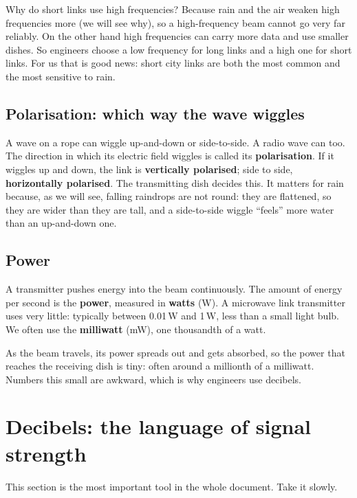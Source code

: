 \documentclass[11pt,a4paper]{article}
\begin{document}
Why do short links use high frequencies? Because rain and the air weaken high frequencies more (we
will see why), so a high-frequency beam cannot go very far reliably. On the other hand high
frequencies can carry more data and use smaller dishes. So engineers choose a low frequency for long
links and a high one for short links. For us that is good news: short city links are both the most
common and the most sensitive to rain.

\subsection{Polarisation: which way the wave wiggles}

A wave on a rope can wiggle up-and-down or side-to-side. A radio wave can too. The direction in
which its electric field wiggles is called its \textbf{polarisation}. If it wiggles up and down,
the link is \textbf{vertically polarised}; side to side, \textbf{horizontally polarised}. The
transmitting dish decides this. It matters for rain because, as we will see, falling raindrops are
not round: they are flattened, so they are wider than they are tall, and a side-to-side wiggle
``feels'' more water than an up-and-down one.

\subsection{Power}

A transmitter pushes energy into the beam continuously. The amount of energy per second is the
\textbf{power}, measured in \textbf{watts} (W). A microwave link transmitter uses very little: typically
between 0.01\,W and 1\,W, less than a small light bulb. We often use the \textbf{milliwatt}
(mW), one thousandth of a watt.

As the beam travels, its power spreads out and gets absorbed, so the power that reaches the
receiving dish is tiny: often around a millionth of a milliwatt. Numbers this small are awkward,
which is why engineers use decibels.

\section{Decibels: the language of signal strength}
\label{sec:db}

This section is the most important tool in the whole document. Take it slowly.
\end{document}

